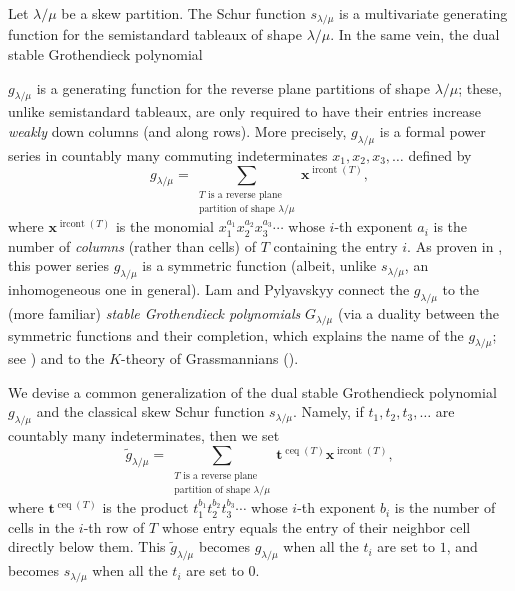 \documentclass[numbers=enddot,12pt,final,onecolumn,notitlepage]{scrartcl}%
\theoremstyle{definition}
\let\sumnonlimits\sum
\renewcommand{\sum}{\sumnonlimits\limits}
\begin{document}
Let $\lambda/\mu$ be a skew partition. The Schur function $s_{\lambda/\mu}$ is
a multivariate generating function for the semistandard tableaux of shape
$\lambda/\mu$. In the same vein, the dual stable Grothendieck
polynomial 
\begin{comment}
\footnote{The word \textquotedblleft polynomial\textquotedblright%
\ is a stretch: $g_{\lambda/\mu}$ is a bounded-degree power series in
infinitely many indeterminates (like $s_{\lambda/\mu}$).} 
\end{comment}
$g_{\lambda/\mu}$ is
a generating function for the reverse plane partitions of shape $\lambda/\mu$;
these, unlike semistandard tableaux, are only required to have their entries
increase \textit{weakly} down columns (and along rows). More precisely,
$g_{\lambda/\mu}$ is a formal power series in countably many commuting
indeterminates $x_{1},x_{2},x_{3},\ldots$ defined by
\[
g_{\lambda/\mu}=\sum_{\substack{T\text{ is a reverse plane}\\\text{partition
of shape }\lambda/\mu}}\mathbf{x}^{\operatorname*{ircont}\left(  T\right)  },
\]
where $\mathbf{x}^{\operatorname*{ircont}\left(  T\right)  }$ is the monomial
$x_{1}^{a_{1}}x_{2}^{a_{2}}x_{3}^{a_{3}}\cdots$ whose $i$-th exponent $a_{i}$
is the number of \textit{columns} (rather than cells) %
of $T$ containing the entry $i$. As proven in
\cite[\S 9.1]{LamPyl}, this power series $g_{\lambda/\mu}$ is a symmetric
function (albeit, unlike $s_{\lambda/\mu}$, an inhomogeneous one in general).
Lam and Pylyavskyy connect the $g_{\lambda/\mu}$ to the (more familiar)
\textit{stable Grothendieck polynomials} $G_{\lambda/\mu}$ (via a duality
between the symmetric functions and their completion, which explains the name
of the $g_{\lambda/\mu}$; see \cite[\S 9.4]{LamPyl}) and to the $K$-theory of
Grassmannians (\cite[\S 9.5]{LamPyl}).

We devise a common generalization of the dual stable Grothendieck polynomial
$g_{\lambda/\mu}$ and the classical skew Schur function $s_{\lambda/\mu}$.
Namely, if $t_{1},t_{2},t_{3},\ldots$ are countably many indeterminates, then we
set%
\[
\widetilde{g}_{\lambda/\mu}=\sum_{\substack{T\text{ is a reverse
plane}\\\text{partition of shape }\lambda/\mu}}\mathbf{t}^{\operatorname*{ceq}%
\left(  T\right)  }\mathbf{x}^{\operatorname*{ircont}\left(  T\right)  },
\]
where $\mathbf{t}^{\operatorname*{ceq}\left(  T\right)  }$ is the product
$t_{1}^{b_{1}}t_{2}^{b_{2}}t_{3}^{b_{3}}\cdots$ whose $i$-th exponent $b_{i}$
is the number of cells in the $i$-th row of $T$ whose entry equals the entry
of their neighbor cell directly below them. This $\widetilde{g}_{\lambda/\mu}$
becomes $g_{\lambda/\mu}$ when all the $t_{i}$ are set to $1$, and becomes
$s_{\lambda/\mu}$ when all the $t_{i}$ are set to $0$.
\end{document}
